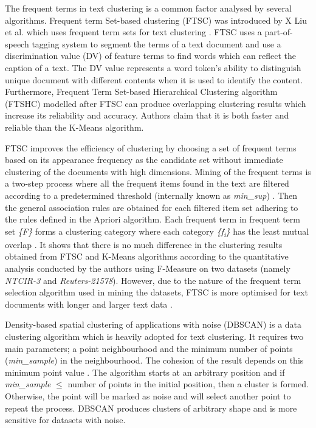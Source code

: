 \documentclass[conference]{IEEEtran}
\begin{document}
The frequent terms in text clustering is a common factor analysed by several algorithms. Frequent term Set-based clustering (FTSC) was introduced by X Liu et al. which uses frequent term sets for text clustering \cite{1527337}. FTSC uses a part-of-speech tagging system to segment the terms of a text document and use a discrimination value (DV) of feature terms to find words which can reflect the caption of a text. The DV value represents a word token's ability to distinguish unique document with different contents when it is used to identify the content. Furthermore, Frequent Term Set-based Hierarchical Clustering algorithm (FTSHC) modelled after FTSC can produce overlapping clustering results which increase its reliability and accuracy. Authors claim that it is both faster and reliable than the K-Means algorithm. 

FTSC improves the efficiency of clustering by choosing a set of frequent terms based on its appearance frequency as the candidate set without immediate clustering of the documents with high dimensions. Mining of the frequent terms is a two-step process where all the frequent items found in the text are filtered according to a predetermined threshold (internally known as \textit{min\_sup}) \cite{1527337}. Then the general association rules are obtained for each filtered item set adhering to the rules defined in the Apriori algorithm. Each frequent term in frequent term set \textit{\{F\}} forms a clustering category where each category \textit{\{f\textsubscript{i}\}} has the least mutual overlap \cite{1527337}. It shows that there is no much difference in the clustering results obtained from FTSC and K-Means algorithms according to the quantitative analysis conducted by the authors using F-Measure on two datasets (namely \textit{NTCIR-3} and \textit{Reuters-21578}). However, due to the nature of the frequent term selection algorithm used in mining the datasets, FTSC is more optimised for text documents with longer and larger text data \cite{1527337}.

Density-based spatial clustering of applications with noise (DBSCAN) is a data clustering algorithm which is heavily adopted for text clustering. It requires two main parameters; a point neighbourhood and the minimum number of points (\textit{min\_sample}) in the neighbourhood. The cohesion of the result depends on this minimum point value \cite{5659055}. The algorithm starts at an arbitrary position and if \textit{min\_sample} $\leq$ number of points in the initial position, then a cluster is formed. Otherwise, the point will be marked as noise and will select another point to repeat the process. DBSCAN produces clusters of arbitrary shape and is more sensitive for datasets with noise. 
\end{document}
